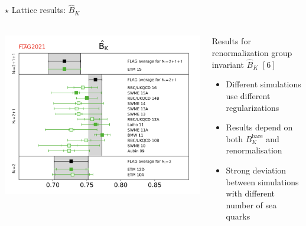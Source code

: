 \documentclass{beamer}
\begin{document}
\begin{frame}[noframenumbering]{$\star$ Lattice results: $\hat B_K$}
      \framesubtitle{\hspace*{1pt}}
      \begin{columns}
            \begin{column}{0.6\textwidth}
                  \includegraphics[width=\textwidth]{assets/hatBK-falg2021.png}
            \end{column}
            \begin{column}{0.4\textwidth}
                  Results for renormalization group invariant $\hat B_K$ $[6]$
                  \begin{itemize}
                        \item Different simulations use different regularizations
                        \item Results depend on both $B_K^\text{bare}$ and renormalisation
                        \item Strong deviation between simulations with different number of sea quarks
                  \end{itemize}
            \end{column}
      \end{columns}
\end{frame}
\end{document}

